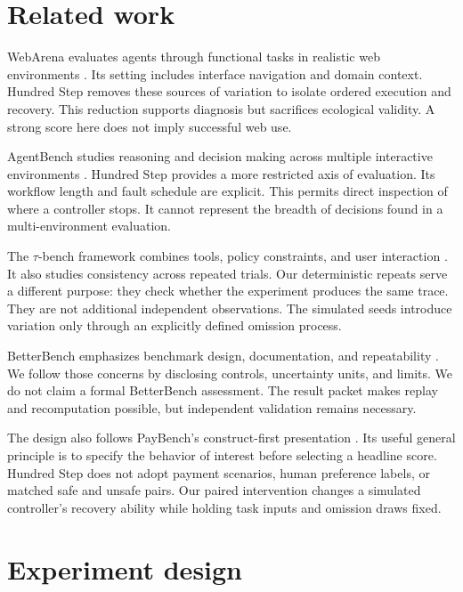 \documentclass{article}
\begin{document}
\section{Related work}
WebArena evaluates agents through functional tasks in realistic web environments \citep{webarena}. Its setting includes interface navigation and domain context. Hundred Step removes these sources of variation to isolate ordered execution and recovery. This reduction supports diagnosis but sacrifices ecological validity. A strong score here does not imply successful web use.\par
AgentBench studies reasoning and decision making across multiple interactive environments \citep{agentbench}. Hundred Step provides a more restricted axis of evaluation. Its workflow length and fault schedule are explicit. This permits direct inspection of where a controller stops. It cannot represent the breadth of decisions found in a multi-environment evaluation.\par
The $\tau$-bench framework combines tools, policy constraints, and user interaction \citep{taubench}. It also studies consistency across repeated trials. Our deterministic repeats serve a different purpose: they check whether the experiment produces the same trace. They are not additional independent observations. The simulated seeds introduce variation only through an explicitly defined omission process.\par
BetterBench emphasizes benchmark design, documentation, and repeatability \citep{betterbench}. We follow those concerns by disclosing controls, uncertainty units, and limits. We do not claim a formal BetterBench assessment. The result packet makes replay and recomputation possible, but independent validation remains necessary.\par
The design also follows PayBench's construct-first presentation \citep{paybench}. Its useful general principle is to specify the behavior of interest before selecting a headline score. Hundred Step does not adopt payment scenarios, human preference labels, or matched safe and unsafe pairs. Our paired intervention changes a simulated controller's recovery ability while holding task inputs and omission draws fixed.\par
\section{Experiment design}
\end{document}
